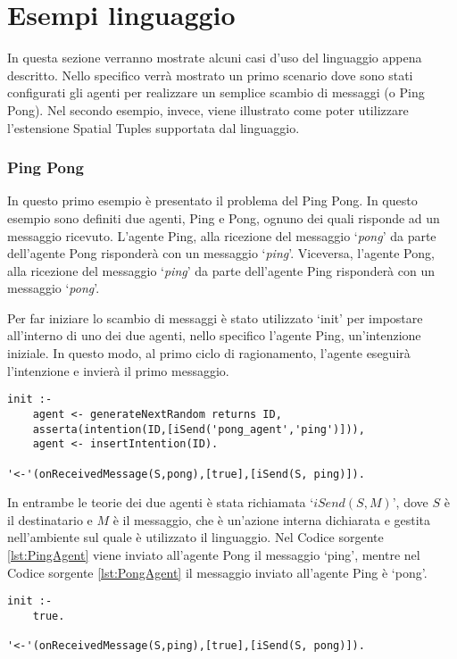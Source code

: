 \section{Esempi linguaggio}
In questa sezione verranno mostrate alcuni casi d'uso del linguaggio appena descritto. Nello specifico verrà mostrato un primo scenario dove sono stati configurati gli agenti per realizzare un semplice scambio di messaggi (o Ping Pong). Nel secondo esempio, invece, viene illustrato come poter utilizzare l'estensione Spatial Tuples supportata dal linguaggio.

\subsubsection{Ping Pong}
In questo primo esempio è presentato il problema del Ping Pong. In questo esempio sono definiti due agenti, Ping e Pong, ognuno dei quali risponde ad un messaggio ricevuto. L'agente Ping, alla ricezione del messaggio `\textit{pong}' da parte dell'agente Pong risponderà con un messaggio `\textit{ping}'. Viceversa, l'agente Pong, alla ricezione del messaggio `\textit{ping}' da parte dell'agente Ping risponderà con un messaggio `\textit{pong}'.

Per far iniziare lo scambio di messaggi è stato utilizzato `init' per impostare all'interno di uno dei due agenti, nello specifico l'agente Ping, un'intenzione iniziale. In questo modo, al primo ciclo di ragionamento, l'agente eseguirà l'intenzione e invierà il primo messaggio.

\switchToProlog{}
\begin{lstlisting}[float,firstnumber=1,label={lst:PingAgent},caption={Agente Ping}]
init :-
    agent <- generateNextRandom returns ID,
    asserta(intention(ID,[iSend('pong_agent','ping')])),
    agent <- insertIntention(ID).

'<-'(onReceivedMessage(S,pong),[true],[iSend(S, ping)]).
\end{lstlisting}

In entrambe le teorie dei due agenti è stata richiamata `$iSend(S, M)$', dove $S$ è il destinatario e $M$ è il messaggio, che è un'azione interna dichiarata e gestita nell'ambiente sul quale è utilizzato il linguaggio. Nel Codice sorgente \ref{lst:PingAgent} viene inviato all'agente Pong il messaggio `ping', mentre nel Codice sorgente \ref{lst:PongAgent} il messaggio inviato all'agente Ping è `pong'.

\switchToProlog{}
\begin{lstlisting}[float,firstnumber=1,label={lst:PongAgent},caption={Agente Pong}]
init :-
    true.

'<-'(onReceivedMessage(S,ping),[true],[iSend(S, pong)]).
\end{lstlisting}

